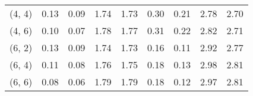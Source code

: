 \begin{tabular}{lrrrrrrrr}
(4, 4)        &                                               0.13 &                                            0.09 &                            1.74 &                                  1.73 &                                               0.30 &                                            0.21 &                            2.78 &                                  2.70 \\
(4, 6)        &                                               0.10 &                                            0.07 &                            1.78 &                                  1.77 &                                               0.31 &                                            0.22 &                            2.82 &                                  2.71 \\
(6, 2)        &                                               0.13 &                                            0.09 &                            1.74 &                                  1.73 &                                               0.16 &                                            0.11 &                            2.92 &                                  2.77 \\
(6, 4)        &                                               0.11 &                                            0.08 &                            1.76 &                                  1.75 &                                               0.18 &                                            0.13 &                            2.98 &                                  2.81 \\
(6, 6)        &                                               0.08 &                                            0.06 &                            1.79 &                                  1.79 &                                               0.18 &                                            0.12 &                            2.97 &                                  2.81 \\
\bottomrule
\end{tabular}
